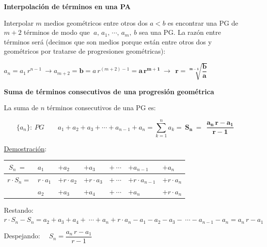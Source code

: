 \vspace{5mm}\begin{large}\textbf{Interpolación de términos en una PA}\end{large}

Interpolar $m$ medios geométricos entre otros dos $a<b$ es encontrar una PG de $m+2$ términos de modo que  $ \ a, \, a_1, \, \cdots ,\,  a_m,\ b$ sea una PG. La razón entre términos será (decimos que son medios porque están entre otros dos y geométricos por tratarse de progresiones geométricas):

$a_n=a_1\,  r^{n-1} \ \to a_{m+2}=\boldsymbol b=a\, r^{(m+2)-1} = 	\boldsymbol{a\, r^{m+1}} \ \to \ \  \boldsymbol{ r=\sqrt[m-1]{\dfrac{b}{a}} }$

\vspace{5mm}

\begin{large} \textbf{Suma de términos consecutivos de una progresión geométrica} \end{large}
\vspace{2mm}

\begin{theorem}

La suma de $n$ términos consecutivos de una PG es:

$$\{a_n\}:\ PG \qquad a_1+a_2+a_3+\cdots + a_{n-1}+a_n= \displaystyle \sum_{k=1}^n	a_k = \ \boxed{ \boldsymbol{S_n\ = \ \ \dfrac{a_n\, r-a_1}{r-1} \ } }$$

\end{theorem}

\underline{Demostración}:

\begin{table}[H]
\centering
\begin{tabular}{lllllll}
$\ S_n \ = \ $ & $a_1$ & $+a_2$  & $+a_3$ & $+ \ \cdots$  & $+a_{n-1}$ & $+a_n$ \\ \hline
$r\cdot S_n=$ & $r\cdot a_1$ & $+r\cdot a_2$  & $+r\cdot a_3$ & $+ \ \cdots$  & $+r\cdot a_{n-1}$ & $+r\cdot a_n$ \\
 & $a_2$ & $+a_3$ & $+a_4$ & $+\ \cdots$ & $+a_n$ & $+r\cdot a_n$ 
\end{tabular}
\end{table}

Restando: $r\cdot S_n-S_n= a_2 +a_3+a_4+\ \cdots+a_n+r\cdot a_n- 
a_1-a_2-a_3- \ \cdots-a_{n-1}-a_n =a_n\, r-a_1$

\vspace{2mm} Despejando: $\quad S_n=\dfrac{a_n\, r-a_1}{r-1}$ \QED

